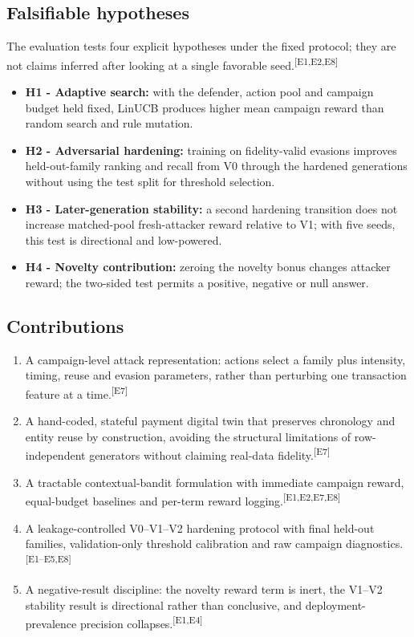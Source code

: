\documentclass[11pt,a4paper,oneside]{article}
\newcommand{\evidence}[1]{\textsuperscript{\textcolor{EvidenceGray}{[#1]}}}
\begin{document}
\subsection{Falsifiable hypotheses}
The evaluation tests four explicit hypotheses under the fixed protocol; they are not claims inferred after looking at a single favorable seed.\evidence{E1,E2,E8}
\begin{itemize}
  \item \textbf{H1 - Adaptive search:} with the defender, action pool and campaign budget held fixed, LinUCB produces higher mean campaign reward than random search and rule mutation.
  \item \textbf{H2 - Adversarial hardening:} training on fidelity-valid evasions improves held-out-family ranking and recall from V0 through the hardened generations without using the test split for threshold selection.
  \item \textbf{H3 - Later-generation stability:} a second hardening transition does not increase matched-pool fresh-attacker reward relative to V1; with five seeds, this test is directional and low-powered.
  \item \textbf{H4 - Novelty contribution:} zeroing the novelty bonus changes attacker reward; the two-sided test permits a positive, negative or null answer.
\end{itemize}

\subsection{Contributions}
\begin{enumerate}
  \item A campaign-level attack representation: actions select a family plus intensity, timing, reuse and evasion parameters, rather than perturbing one transaction feature at a time.\evidence{E7}
  \item A hand-coded, stateful payment digital twin that preserves chronology and entity reuse by construction, avoiding the structural limitations of row-independent generators without claiming real-data fidelity.\evidence{E7}\cite{sajja2026synthetic}
  \item A tractable contextual-bandit formulation with immediate campaign reward, equal-budget baselines and per-term reward logging.\evidence{E1,E2,E7,E8}
  \item A leakage-controlled V0--V1--V2 hardening protocol with final held-out families, validation-only threshold calibration and raw campaign diagnostics.\evidence{E1--E5,E8}
  \item A negative-result discipline: the novelty reward term is inert, the V1--V2 stability result is directional rather than conclusive, and deployment-prevalence precision collapses.\evidence{E1,E4}
\end{enumerate}
\end{document}
